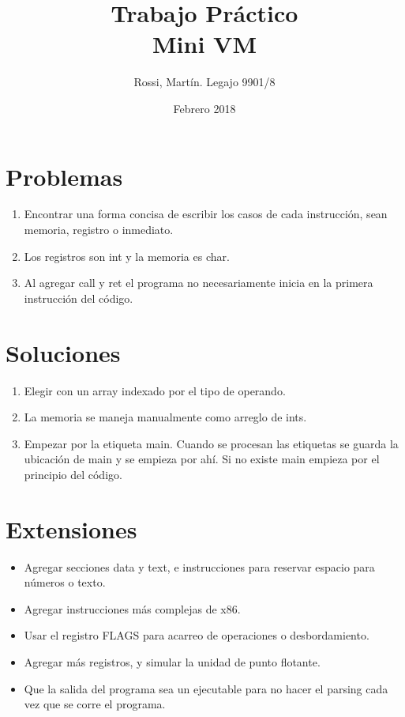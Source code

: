 \documentclass[12pt]{article}
\title{{\textbf{\Large{Trabajo Práctico}\\Mini VM}}}
\author{Rossi, Martín. Legajo 9901/8}
\date{Febrero 2018}
\begin{document}
\maketitle
\section*{Problemas}
\begin{enumerate}
\item Encontrar una forma concisa de escribir los casos de cada instrucción, sean memoria, registro o inmediato.
\item Los registros son int y la memoria es char.
\item Al agregar call y ret el programa no necesariamente inicia en la primera instrucción del código.
\end{enumerate}
\section*{Soluciones}
\begin{enumerate}
\item Elegir con un array indexado por el tipo de operando.
\item La memoria se maneja manualmente como arreglo de ints.
\item Empezar por la etiqueta main. Cuando se procesan las etiquetas se guarda la ubicación de main y se empieza por ahí. Si no existe main empieza por el principio del código.
\end{enumerate}
\section*{Extensiones}
\begin{itemize}
\item Agregar secciones data y text, e instrucciones para reservar espacio para números o texto.
\item Agregar instrucciones más complejas de x86.
\item Usar el registro FLAGS para acarreo de operaciones o desbordamiento.
\item Agregar más registros, y simular la unidad de punto flotante.
\item Que la salida del programa sea un ejecutable para no hacer el parsing cada vez que se corre el programa.
\end{itemize}
\end{document}
